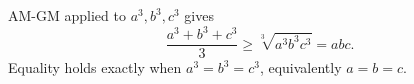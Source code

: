 AM-GM applied to $a^3,b^3,c^3$ gives
\[
\dfrac{a^3+b^3+c^3}{3}\ge\sqrt[3]{a^3b^3c^3}=abc.
\]
Equality holds exactly when $a^3=b^3=c^3$, equivalently $\boxed{a=b=c}$.
